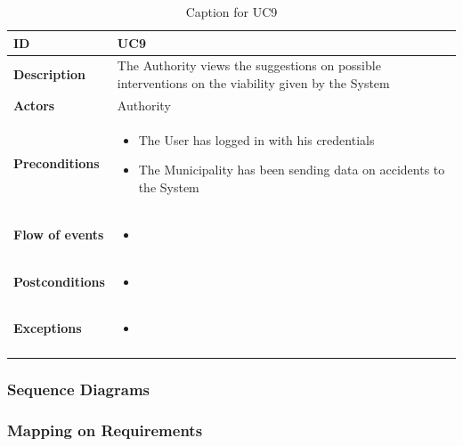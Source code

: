 \documentclass {article}
\begin{document}
			
					\begin{longtable}{| p{3 cm} | p{8.5 cm} |} 
			\hline
			{\bf ID} & UC9 \\
			\hline
			{\bf Description} & The Authority views the suggestions on possible interventions on the viability given by the System \\
			\hline
			{\bf Actors} & Authority\\
			\hline
			{\bf Preconditions} & \begin{itemize}
								  \item The User has logged in with his credentials
								  \item The Municipality has been sending data on accidents to the System
								  \end{itemize}	\\
			\hline
			{\bf Flow of events} &	\begin{itemize}
								  \item
								  \end{itemize}	\\
			\hline
			{\bf Postconditions} & \begin{itemize}
								  \item
								  \end{itemize}	 \\
			\hline
			{\bf Exceptions} & 	\begin{itemize}
								  \item
								  \end{itemize}	\\
			\hline
			\caption{Caption for UC9}
			\end{longtable}

	\subsubsection{Sequence Diagrams}
	\subsubsection{Mapping on Requirements}
\end{document}
